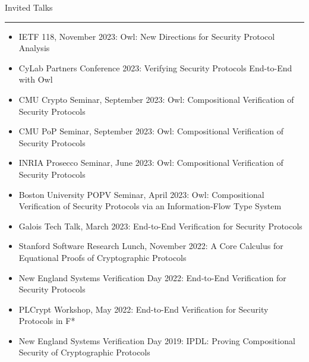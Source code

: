 \documentclass{article}
\newcommand{\rsection}[1]{\vspace{1em} {\huge #1} \vspace{0.5em} \hrule \vspace{1em}}
\begin{document}

\rsection{Invited Talks}
\begin{itemize}
    \item IETF 118, November 2023: Owl: New Directions for Security Protocol Analysis
    \item CyLab Partners Conference 2023: Verifying Security Protocols
        End-to-End with Owl
    \item CMU Crypto Seminar, September 2023: Owl: Compositional Verification of Security Protocols
    \item CMU PoP Seminar, September 2023: Owl: Compositional Verification of Security Protocols 
    \item INRIA Prosecco Seminar, June 2023: Owl: Compositional Verification of Security Protocols
    \item Boston University POPV Seminar, April 2023: Owl: Compositional Verification of Security Protocols via an Information-Flow Type System
    \item Galois Tech Talk, March 2023: End-to-End Verification for Security Protocols
    \item Stanford Software Research Lunch, November 2022: A Core Calculus for Equational Proofs of Cryptographic Protocols
    \item New England Systems Verification Day 2022: End-to-End Verification for Security Protocols
    \item PLCrypt Workshop, May 2022: End-to-End Verification for Security Protocols in F*
    \item New England Systems Verification Day 2019: IPDL: Proving Compositional Security of Cryptographic Protocols
\end{itemize}
\end{document}
